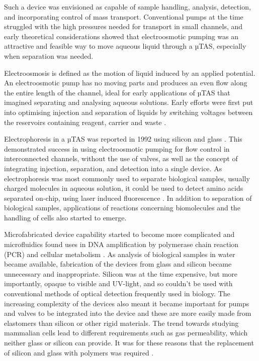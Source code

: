 Such a device was envisioned as capable of sample handling, analysis, detection, and incorporating control of
mass transport. Conventional pumps at the time struggled with the high pressures needed for transport
in small channels, and early theoretical considerations showed that electroosmotic pumping was an attractive and
feasible way to move aqueous liquid through a µTAS, especially when separation was needed.

Electroosmosis is defined as the motion of liquid induced by an applied potential. An electroosmotic pump
has no moving parts and produces an even flow along the entire length of the channel, ideal for early applications
of µTAS that imagined separating and analysing aqueous solutions. Early efforts were first put into optimising
injection and separation of liquids by switching voltages between the reservoirs containing reagent, carrier and
waste \citep{manz1991integrated}.

Electrophoresis in a µTAS was reported in 1992 using silicon and glass \citep{harrison1992capillary}. This
demonstrated success in using electroosmotic pumping for flow control in interconnected channels, without the
use of valves, as well as the concept of integrating injection, separation, and detection into a single device. As
electrophoresis was most commonly used to separate biological samples, usually charged molecules in aqueous
solution, it could be used to detect amino acids separated on-chip, using laser induced fluorescence
\citep{seiler1993planar}. In addition to separation of biological samples, applications of reactions concerning biomolecules and the handling of cells also started to emerge.

Microfabricated device capability started to become more complicated and microfluidics found uses in DNA
amplification by polymerase chain reaction
(PCR) \citep{woolley1996functional} and cellular metabolism \citep{bousse1994micromachined}.
As analysis of biological samples in water became available, fabrication of the devices
from glass and silicon became unnecessary and inappropriate. Silicon was at the time expensive, but more
importantly, opaque to visible and UV-light, and so couldn't be used with conventional methods of optical
detection frequently used in biology. The increasing complexity of the devices also meant it became
important for pumps and valves to be integrated into the device and these are more easily made from elastomers
than silicon or other rigid materials. The trend towards studying mammalian cells lead to different requirements such as gas
permeability, which neither glass or silicon can provide. It was for these reasons that the replacement of silicon and glass with polymers was required \citep{RN5}.


